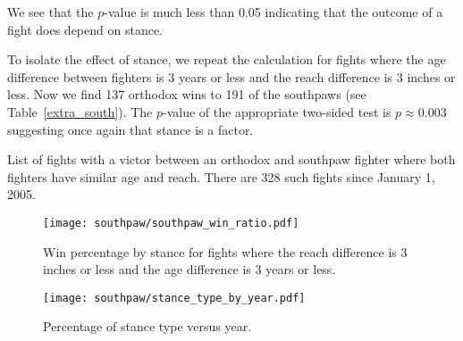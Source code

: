 \noindent
We see that the $p$-value is much less than 0.05 indicating that the outcome of a fight does depend on stance.

To isolate the effect of stance, we repeat the calculation for fights where the age difference between fighters
is 3 years or less and the reach difference is 3 inches or less. 
Now we find 137 orthodox wins to 191 of the southpaws (see Table~\ref{extra_south}). The $p$-value of the
appropriate two-sided test is $p \approx 0.003$ suggesting once again
that stance is a factor.

\begin{center}
\begin{table}[h]

\caption{List of fights with a victor between an orthodox and southpaw fighter where both fighters have
similar age and reach. There are 328 such fights since January 1, 2005.}
\label{extra_south}
\end{table}
\end{center}

\begin{figure}[h]
\begin{center}
\texttt{[image: southpaw/southpaw\_win\_ratio.pdf]}
\caption{Win percentage by stance for fights where the reach difference
is 3 inches or less and the age difference is 3 years or less.}
\end{center}
\end{figure}

\begin{figure}[h]
\begin{center}
\texttt{[image: southpaw/stance\_type\_by\_year.pdf]}
\caption{Percentage of stance type versus year.}
\end{center}
\end{figure}

